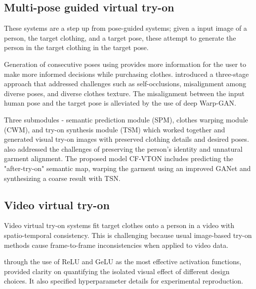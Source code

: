 	\subsection{\textbf{Multi-pose guided virtual try-on}}
		These systems are a step up from pose-guided systems; given a input image of a person, the target clothing, and a target pose, these attempt to generate the person in the target clothing in the target pose.

        Generation of consecutive poses using \cite{DBLP:conf/icip/HsiehCCSC19} provides more information for the user to make more informed decisions while purchasing clothes. \cite{DBLP:conf/iccv/DongLSWLZH019} introduced a three-stage approach that addressed challenges such as self-occlusions, misalignment among diverse poses, and diverse clothes texture. The misalignment between the input human pose and the target pose is alleviated by the use of deep Warp-GAN.


        Three submodules - semantic prediction module (SPM), clothes warping module (CWM), and try-on synthesis module (TSM) which worked together \cite{DBLP:journals/tmm/HuLZR22}  and generated visual try-on images with preserved clothing details and desired poses. \cite{du2023cf} also addressed the challenges of preserving the person's identity and unnatural garment alignment. The proposed model CF-VTON includes predicting the "after-try-on" semantic map, warping the garment using an improved GANet and synthesizing a coarse result with TSN.
        

	\subsection{\textbf{Video virtual try-on}}
		Video virtual try-on systems fit target clothes onto a person in a video with spatio-temporal consistency. This is challenging because usual image-based try-on methods cause frame-to-frame inconsistencies when applied to video data.

        \cite{DBLP:conf/wacv/KuppaJLLM21} through the use of ReLU and GeLU as the most effective activation functions, provided clarity on quantifying the isolated visual effect of different design choices. It also specified hyperparameter details for experimental reproduction. 


